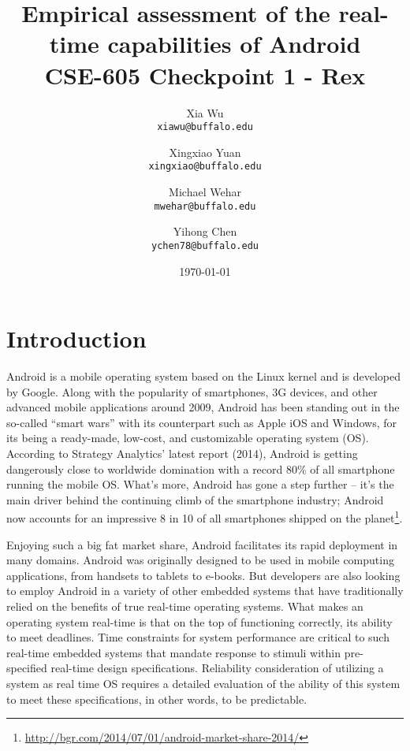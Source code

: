 \documentclass[11pt]{article}
\author{Xia Wu\\ \texttt{xiawu@buffalo.edu} \and Xingxiao Yuan\\ \texttt{xingxiao@buffalo.edu} \and Michael Wehar\\ \texttt{mwehar@buffalo.edu} \and Yihong Chen\\ \texttt{ychen78@buffalo.edu}}
\date{\today}
\title{Empirical assessment of the real-time capabilities of Android\\\large CSE-605 Checkpoint 1 - Rex}
\begin{document}
\maketitle
\tableofcontents


\section{Introduction}
\label{sec-1}
Android is a mobile operating system based on the Linux kernel and is developed by Google. Along with the popularity of smartphones, 3G devices, and other advanced mobile applications around 2009, Android has been standing out in the so-called “smart wars” with its counterpart such as Apple iOS and Windows, for its being a ready-made, low-cost, and customizable operating system (OS). According to Strategy Analytics’ latest report (2014), Android is getting dangerously close to worldwide domination with a record 80\% of all smartphone running the mobile OS. What’s more, Android has gone a step further – it’s the main driver behind the continuing climb of the smartphone industry; Android now accounts for an impressive 8 in 10 of all smartphones shipped on the planet\footnote{\url{http://bgr.com/2014/07/01/android-market-share-2014/}}.

Enjoying such a big fat market share, Android facilitates its rapid deployment in many domains. Android was originally designed to be used in mobile computing applications, from handsets to tablets to e-books. But developers are also looking to employ Android in a variety of other embedded systems that have traditionally relied on the benefits of true real-time operating systems. What makes an operating system real-time is that on the top of functioning correctly, its ability to meet deadlines. Time constraints for system performance are critical to such real-time embedded systems that mandate response to stimuli within pre-specified real-time design specifications. Reliability consideration of utilizing a system as real time OS requires a detailed evaluation of the ability of this system to meet these specifications, in other words, to be predictable.
\end{document}
